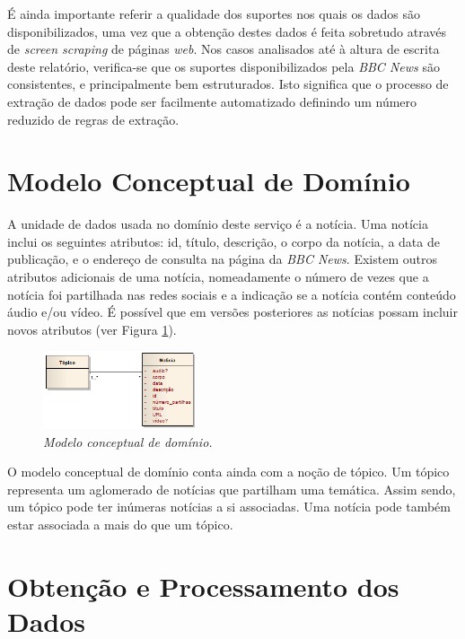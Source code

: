 \documentclass[twocolumn,twoside,10pt,a4paper]{article}
\begin{document}
É ainda importante referir a qualidade dos suportes nos quais os dados são disponibilizados, uma vez que a obtenção destes dados é feita sobretudo através de \textit{screen scraping} de páginas \textit{web}. Nos casos analisados até à altura de escrita deste relatório, verifica-se que os suportes disponibilizados pela \textit{BBC News} são consistentes, e principalmente bem estruturados. Isto significa que o processo de extração de dados pode ser facilmente automatizado definindo um número reduzido de regras de extração.

\section{Modelo Conceptual de Domínio}\label{sec:model}

A unidade de dados usada no domínio deste serviço é a notícia. Uma notícia inclui os seguintes atributos: id, título, descrição, o corpo da notícia, a data de publicação, e o endereço de consulta na página da \textit{BBC News}. Existem outros atributos adicionais de uma notícia, nomeadamente o número de vezes que a notícia foi partilhada nas redes sociais e a indicação se a notícia contém conteúdo áudio e/ou vídeo. É possível que em versões posteriores as notícias possam incluir novos atributos (ver Figura \ref{fig:domain}).

\begin{figure}[ht]
\centerline{\includegraphics[width=0.4\textwidth]{domain.png}}
\caption{{\it Modelo conceptual de domínio.}}  
\label{fig:domain}
\end{figure}

O modelo conceptual de domínio conta ainda com a noção de tópico. Um tópico representa um aglomerado de notícias que partilham uma temática. Assim sendo, um tópico pode ter inúmeras notícias a si associadas. Uma notícia pode também estar associada a mais do que um tópico.

\section{Obtenção e Processamento dos Dados}\label{sec:processing}
\end{document}
